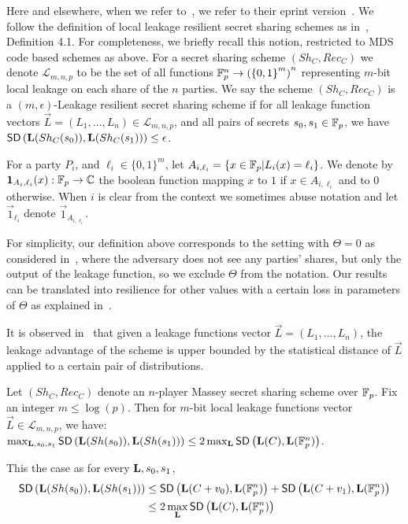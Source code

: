 Here and elsewhere, when we refer to~\cite{EPRINT:BDIR19}, we refer to their eprint version~\cite{EPRINT:BDIR19}.
We follow the definition of local leakage resilient secret sharing schemes as in~\cite{EPRINT:BDIR19}, Definition 4.1.  For completeness, we briefly recall this notion, restricted to MDS code based schemes as above. For a secret sharing scheme $(Sh_C,Rec_C)$ we denote ${\mathcal L}_{m,n,p}$ to be the set of all functions $\mathbb{F}^n_p\to \left({\{0,1\}}^m\right)^n$ representing $m$-bit local leakage on each share of the $n$ parties.
We say the scheme $(Sh_C,Rec_C)$
is a $(m,\epsilon)$-Leakage resilient secret sharing scheme if for all leakage function vectors $\vec{L}=(L_1,\ldots,L_n) \in {\mathcal L}_{m,n,p}$,
and all pairs of secrets $s_0,s_1\in\mathbb{F}_p$, we have $\mathsf{SD} \left({\mathbf{L}(Sh_C(s_0))},{\mathbf{L}(Sh_C(s_1))} \right)\leq \epsilon$.

For a party $P_i$, and $\ell_i\in \{0,1\}^m$, let $A_{i,\ell_i}=\{ x \in \mathbb{F}_p | L_i(x) = \ell_i \}$. We denote by $\mathbf{1}_{A_i,\ell_i}(x):\mathbb{F}_p\rightarrow \mathbb{C}$ the boolean function mapping $x$ to $1$ if $x\in A_{i,\ell_i}$ and to $0$ otherwise.
When $i$ is clear from the context we sometimes abuse notation and let $\vec{1}_{\ell_i}$ denote $\vec{1}_{A_{i,\ell_i}}$.

For simplicity, our definition above corresponds to the setting with $\Theta=0$ as considered in~\cite{EPRINT:BDIR19}, where the adversary does not see any parties' shares, but only the output of the leakage function, so we exclude $\Theta$ from the notation.
Our results can be translated into resilience for other values with a certain loss in parameters of $\Theta$ as explained in~\cite{EPRINT:BDIR19}.


It is observed in~\cite{EPRINT:BDIR19} that given a leakage functions vector $\vec{L} = (L_1,\ldots,L_n)$, the leakage advantage of the scheme is upper bounded by the statistical distance of $\vec{L}$ applied to a certain pair of distributions.

\begin{observation}\label{obs:bound}
Let $(Sh_C,Rec_C)$ denote an $n$-player Massey secret sharing scheme over $\mathbb{F}_p$. Fix an integer $m\leq \log(p)$. Then for $m$-bit local leakage functions vector $\vec{L}\in {\mathcal{L}}_{m,n,p}$, we have: 
$\max_{\mathbf{L},s_0,s_1} \mathsf{SD} \left({\mathbf{L}(Sh(s_0))},{\mathbf{L}(Sh(s_1))} \right) \leq 2\max_{\mathbf{L}} \mathsf{SD} \left({\mathbf{L}(C)},{\mathbf{L}(\mathbb{F}^n_p)} \right)$. 
\end{observation}
This the case as for every $\mathbf{L},s_0,s_1$,
\begin{align*}
    \mathsf{SD} \left({\mathbf{L}(Sh(s_0))},{\mathbf{L}(Sh(s_1))} \right) &\leq
    \mathsf{SD} \left({\mathbf{L}(C+v_0)},{\mathbf{L}(\mathbb{F}^n_p)} \right) + \mathsf{SD} \left({\mathbf{L}(C+v_1)},{\mathbf{L}(\mathbb{F}^n_p)} \right) \\
    &\leq 2 \max_{\mathbf{L}}\mathsf{SD} \left({\mathbf{L}(C)},{\mathbf{L}(\mathbb{F}^n_p)} \right)
\end{align*} 

